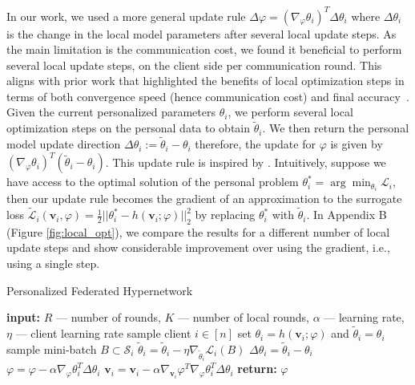 \documentclass{article}
\def\gL{{\mathcal{L}}}
\def\gS{{\mathcal{S}}}
\newcommand{\bv}{\boldsymbol{v}}
\begin{document}
In our work, we used a more general update rule $\Delta\varphi=(\nabla_{\varphi}\theta_i)^T\Delta\theta_i$ where $\Delta\theta_i$ is the change in the local model parameters after several local update steps. As the main limitation is the communication cost, we found it beneficial to perform several local update steps, on the client side per communication round. This aligns with prior work that highlighted the benefits of local optimization steps in terms of both convergence speed (hence communication cost) and final accuracy~\cite{McMahan2017CommunicationEfficientLO,huo2020faster}.
Given the current personalized parameters $\theta_i$, we perform several  local optimization steps on the personal data to obtain $\tilde{\theta}_i$. We then return the personal model update direction $\Delta\theta_i:=\tilde{\theta}_i-\theta_i$ therefore, the update for $\varphi$ is given by $(\nabla_{\varphi}\theta_i)^T(\tilde{\theta}_i-\theta_i)$. This update rule is inspired by  \citet{zhang2019lookahead}. Intuitively, suppose we have access to the optimal solution of the personal problem $\theta_i^*=\arg\min_{\theta_i}\gL_i$, then our update rule becomes the gradient of an approximation to the surrogate loss $\tilde{\gL}_i(\bv_i,\varphi)=\frac{1}{2}||\theta_i^* - h(\bv_i;\varphi)||^2_2$ by replacing $\theta_i^*$ with $\tilde{\theta}_i$. In Appendix B (Figure \ref{fig:local_opt}), 
we compare the results for a different number of local update steps and show considerable improvement over using the gradient, i.e., using a single step.



\begin{algorithm}[t]
    \caption{Personalized Federated Hypernetwork}\small\label{alg:fhn}
    \begin{algorithmic}[H]
    \State \textbf{input:} $R$ --- number of rounds, $K$ --- number of local rounds, $\alpha$ --- learning rate, $\eta$ --- client learning rate
    \State sample client $i\in [n]$
    \State set $\theta_i=h(\bv_i;\varphi)$ and  $\tilde{\theta}_i=\theta_i$
    \State sample mini-batch $B \subset \gS_i$ 
    \State $\tilde{\theta}_i=\tilde{\theta}_i-\eta \nabla_{\tilde{\theta}_i}\gL_i(B)$
    \EndFor
    \State $\Delta\theta_i=\tilde{\theta}_i-\theta_i$
    \State $\varphi=\varphi-\alpha \nabla_{\varphi}\theta_i^T \Delta \theta_i$
    \State $\bv_i=\bv_i - \alpha \nabla_{\bv_i}\varphi^T \nabla_{\varphi}\theta_i^T \Delta \theta_i$
    \EndFor
    \State \textbf{return:} $\varphi$
    \end{algorithmic}
\end{algorithm}
\end{document}
